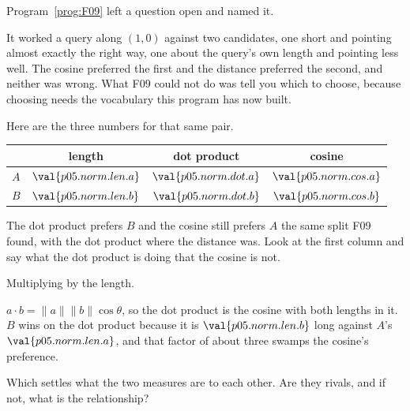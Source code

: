 \begin{fr}
Program~\ref{prog:F09} left a question open and named it.

It worked a query along $(1, 0)$ against two candidates, one short and pointing
almost exactly the right way, one about the query's own length and pointing
less well. The cosine preferred the first and the distance preferred the
second, and neither was wrong. What F09 could not do was tell you which to
choose, because choosing needs the vocabulary this program has now built.

Here are the three numbers for that same pair.
\end{fr}

\begin{fr}
\begin{center}
\begin{tabular}{lccc}
\toprule
& length & dot product & cosine \\
\midrule
$A$ & $\val{p05.norm.len.a}$ & $\val{p05.norm.dot.a}$ & $\val{p05.norm.cos.a}$ \\
$B$ & $\val{p05.norm.len.b}$ & $\val{p05.norm.dot.b}$ & $\val{p05.norm.cos.b}$ \\
\bottomrule
\end{tabular}
\end{center}

The dot product prefers $B$ and the cosine still prefers $A$ \dash{} the same
split F09 found, with the dot product where the distance was. Look at the first
column and say what the dot product is doing that the cosine is not.
\nextframe
\end{fr}

\begin{fr}
\begin{ansblock}
Multiplying by the length.
\end{ansblock}

$a \cdot b = \lVert a \rVert \lVert b \rVert \cos\theta$, so the dot product is
the cosine with both lengths in it. $B$ wins on the dot product because it is
$\val{p05.norm.len.b}$ long against $A$'s $\val{p05.norm.len.a}$, and that
factor of about three swamps the cosine's preference.

Which settles what the two measures are to each other. Are they rivals, and if
not, what is the relationship?
\dotline
\nextframe
\end{fr}

